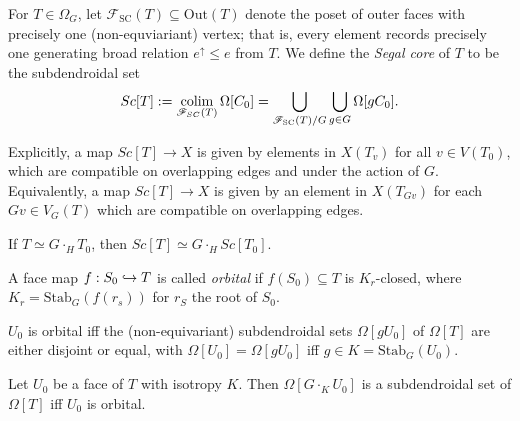 \documentclass[a4paper,10pt,draft]{article}%
\begin{document}
\begin{definition}
      For $T \in \Omega_G$, let $\mathscr{F}_{\mathrm{SC}}(T) \subseteq \mathrm{Out}(T)$ denote the poset of outer faces
      with precisely one (non-equviariant) vertex;
      that is, every element records precisely one generating broad relation
      $e^\uparrow \leq e$ from $T$.
      We define the \textit{Segal core} of $T$ to be the subdendroidal set
      \begin{equation}
            Sc[T] :=
            \mathop{\operatorname{colim}}\limits_{\mathscr{F}_{SC}(T)} \Omega[C_0]
            = \mathop{\bigcup}\limits_{\mathscr{F}_{\mathrm{SC}}(T)/G}\mathop{\bigcup}\limits_{g \in G}\Omega[g C_0].
      \end{equation}
\end{definition}

\begin{remark}
      Explicitly, a map $Sc[T] \to X$ is given by elements in
      $X(T_v)$
      for all $v \in V(T_0)$,
      which are compatible on overlapping edges and under the action of $G$.
      Equivalently, a map $Sc[T] \to X$ is given by an element in $X(T_{G v})$ for each $G v \in V_G(T)$
      which are compatible on overlapping edges.
\end{remark}

\begin{remark}
      If $T \simeq G \cdot_H T_0$, then
      $Sc[T] \simeq G \cdot_H Sc[T_0]$.
\end{remark}


\begin{definition}
      A face map $f:S_0 \hookrightarrow T$ is called \textit{orbital} if
      $f(S_0) \subseteq T$ is $K_r$-closed, where $K_r = \mathrm{Stab}_G(f(r_s))$ for $r_S$ the root of $S_0$.
\end{definition}

\begin{remark}
      \label{ORB_REM}
      $U_0$ is orbital iff the (non-equivariant) subdendroidal sets $\Omega[g U_0]$ of $\Omega[T]$ are either
      disjoint or equal, with $\Omega[U_0] = \Omega[g U_0]$ iff $g \in K = \mathrm{Stab}_G(U_0)$.
\end{remark}


\begin{lemma}
      \label{ORB_INJ_LEM}
      Let $U_0$ be a face of $T$ with isotropy $K$.
      Then $\Omega[G \cdot_K U_0]$ is a subdendroidal set of $\Omega[T]$
      iff
      $U_0$ is orbital.
\end{lemma}
\end{document}
